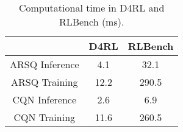 \begin{table}[h]
    \centering
    \begin{tabular}{c|cc}
        \toprule
         & D4RL & RLBench \\
        \midrule
        ARSQ Inference & 4.1 & 32.1 \\
        ARSQ Training & 12.2 & 290.5  \\
        CQN Inference & 2.6 & 6.9 \\
        CQN Training & 11.6 & 260.5 \\
        \bottomrule
    \end{tabular}
    \caption{Computational time in D4RL and RLBench (ms). }
    \label{fig:exp-abl-compute}
\end{table}
